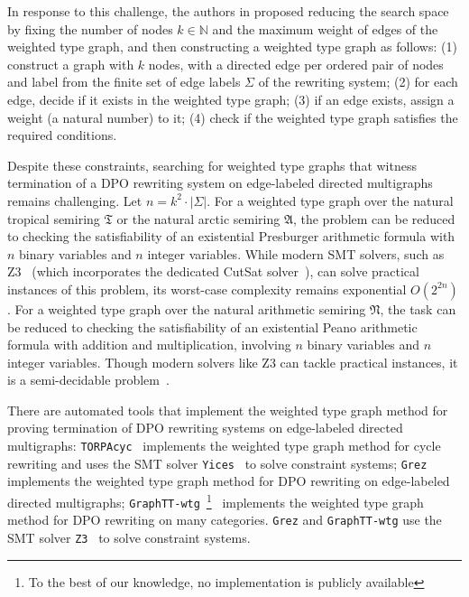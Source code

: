     In response to this challenge, the authors in \cite{zantema2014termination,bruggink2014termination,bruggink2015proving} proposed reducing the search space by fixing the number of nodes \( k \in \mathbb{N} \) and the maximum weight of edges of the weighted type graph, and then constructing a weighted type graph as follows: (1) construct a graph with \( k \) nodes, with a directed edge per ordered pair of nodes and label from the finite set of edge labels $\Sigma$ of the rewriting system; (2) for each edge, decide if it exists in the weighted type graph; (3) if an edge exists, assign a weight (a natural number) to it; (4) check if the weighted type graph satisfies the required conditions.
    
    Despite these constraints, searching for weighted type graphs that witness termination of a DPO rewriting system on edge-labeled directed multigraphs
    remains challenging. 
    Let $n = k^2 \cdot | \Sigma |$.
    For a weighted type graph over the natural tropical semiring $\mathfrak{T}$ or the natural arctic semiring $\mathfrak{A}$, the problem can be reduced to checking the satisfiability of an existential Presburger arithmetic formula with $n$ binary variables and $n$ integer variables.
    While modern SMT solvers, such as Z3~\cite{arithmetic2024z3} (which incorporates the dedicated CutSat solver~\cite{z3ilp_cutsat}), can solve practical instances of this problem, its worst-case complexity remains exponential \( O(2^{2n}) \).
     For a weighted type graph over the natural arithmetic semiring $\mathfrak{N}$, the task can be reduced to checking the satisfiability of an existential Peano arithmetic formula with addition and multiplication, involving $n$ binary variables and $n$ integer variables. Though modern solvers like Z3 can tackle practical instances, it is a semi-decidable problem~\cite{matiyasevivc2003enumerable}.

    There are automated tools that implement the weighted type graph method for proving termination of DPO rewriting systems on edge-labeled directed multigraphs: 
    \texttt{TORPAcyc}~\cite{TORPAcyc} implements the weighted type graph method for cycle rewriting and uses the SMT solver \texttt{Yices}~\cite{yices} to solve constraint systems;
    \texttt{Grez}~\cite{grez} implements the weighted type graph method for DPO rewriting on edge-labeled directed multigraphs; \texttt{GraphTT-wtg}~\footnote{To the best of our knowledge, no implementation is publicly available}~\cite{endrullis2024generalized_arxiv_v3} implements the weighted type graph method for DPO rewriting on many categories.
    \texttt{Grez} and \texttt{GraphTT-wtg}
    use  the SMT solver \texttt{Z3}~\cite{de2008z3} to solve constraint systems.


